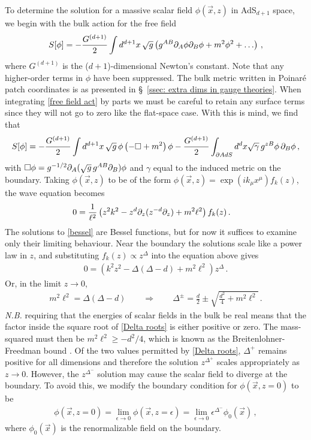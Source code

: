 \documentclass[../PhD.tex]{subfiles}
\begin{document}
To determine the solution for a massive scalar field $\phi(\vec x, z)$ in AdS$_{d+1}$ space, we begin with the bulk action for the free field
\begin{align}
\label{free field act}
S[\phi] = -\frac{G^{(d+1)}}{2} \int d^{d+1} x \, \sqrt{g} \left( g^{AB} \partial_A \phi \partial_B \phi + m^2 \phi^2 + \ldots \right) \, ,
\end{align}
where $G^{(d+1)}$ is the ($d+1$)-dimensional Newton's constant. Note that any higher-order terms in $\phi$ have been suppressed. The bulk metric written in Poinar\'e patch coordinates is as presented in \S~\!\ref{ssec: extra dims in gauge theories}. When integrating \eqref{free field act} by parts we must be careful to retain any surface terms since they will not go to zero like the flat-space case. With this is mind, we find that
\begin{align}
\label{action int by parts}
S[\phi] = -\frac{G^{(d+1)}}{2} \int d^{d+1}x \, \sqrt{g}\, \phi \left( - \Box + m^2 \right) \phi - \frac{G^{(d+1)}}{2}\int_{\partial AdS} d^d x \sqrt{\gamma} \, g^{zB} \phi \, \partial_B \phi \, ,
\end{align}
with $\Box \phi = g^{-1/2} \partial_A (\sqrt{g} \, g^{AB} \partial_B) \phi$ and $\gamma$ equal to the induced metric on the boundary. Taking $\phi(\vec x, z)$ to be of the form $\phi(\vec x, z) = \exp( i k_\mu x^\mu) f_k (z)$, the wave equation becomes
\begin{align}
\label{bessel}
0 &= \frac{1}{\ell^2} \left( z^2 k^2 - z^{d} \partial_z (z^{-d} \partial_z ) + m^2 \ell^2 \right) f_k(z) \, .
\end{align}
The solutions to \eqref{bessel} are Bessel functions, but for now it suffices to examine only their limiting behaviour. Near the boundary the solutions scale like a power law in $z$, and substituting $f_k(z) \propto z^{\Delta}$ into the equation above gives
\begin{align}
0 = \left(k^2 z^2 - \Delta(\Delta - d) + m^2 \ell^2 \right) z^\Delta \, .
\end{align}
Or, in the limit $z \to 0$,
\begin{align}
\label{Delta roots}
m^2 \ell^2 = \Delta (\Delta - d) \qquad \Rightarrow \qquad \Delta^{\pm} = \frac{d}{2} \pm \sqrt{\frac{d^2}{4} + m^2\ell^2} \, .
\end{align}
{\it N.B.} requiring that the energies of scalar fields in the bulk be real means that the factor inside the square root of \eqref{Delta roots} is either positive or zero. The mass-squared must then be $m^2 \ell^2 \geq - d^2 /4$, which is known as the Breitenlohner-Freedman bound \cite{Breitenlohner:1982bm}. Of the two values permitted by \eqref{Delta roots}, $\Delta^+$ remains positive for all dimensions and therefore the solution $z^{\Delta^+}$ scales appropriately as $z \to 0$. However, the $z^{\Delta^-}$ solution may cause the scalar field to diverge at the boundary. To avoid this, we modify the boundary condition for $\phi(\vec x, z=0)$ to be
\begin{align}
\label{scalar bc}
\phi(\vec x, z=0) = \lim_{\epsilon \to 0} \phi(\vec x, z=\epsilon) = \lim_{\epsilon \to 0} \epsilon^{\Delta^-} \phi_0 (\vec x) \, ,
\end{align}
where $\phi_0 (\vec x)$ is the renormalizable field on the boundary. 
\end{document}
